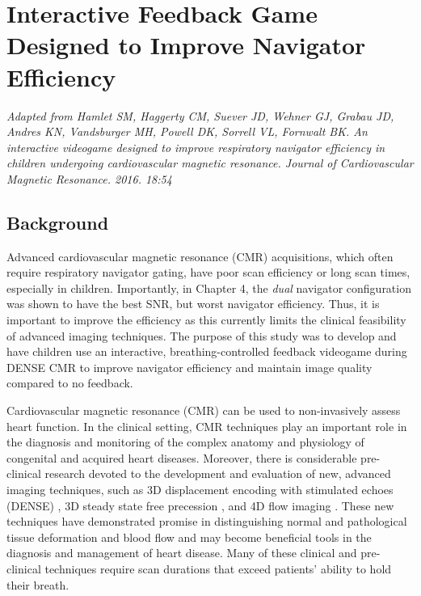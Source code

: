 \chapter{Interactive Feedback Game Designed to Improve Navigator Efficiency}

\begin{center}
	\textit{Adapted from Hamlet SM, Haggerty CM, Suever JD, Wehner GJ, Grabau JD, Andres KN, Vandsburger MH, Powell DK, Sorrell VL, Fornwalt BK. An interactive videogame designed to improve respiratory navigator efficiency in children undergoing cardiovascular magnetic resonance. Journal of Cardiovascular Magnetic Resonance. 2016. 18:54} \cite{Hamlet2016a}
\end{center}
	
\section{Background}
	Advanced cardiovascular magnetic resonance (CMR) acquisitions, which often require respiratory navigator gating, have poor scan efficiency or long scan times, especially in children. Importantly, in Chapter 4, the \textit{dual} navigator configuration was shown to have the best SNR, but worst navigator efficiency. Thus, it is important to improve the efficiency as this currently limits the clinical feasibility of advanced imaging techniques. The purpose of this study was to develop and have children use an interactive, breathing-controlled feedback videogame during DENSE CMR to improve navigator efficiency and maintain image quality compared to no feedback.

	Cardiovascular magnetic resonance (CMR) can be used to non-invasively assess heart function. In the clinical setting, CMR techniques play an important role in the diagnosis and monitoring of the complex anatomy and physiology of congenital and acquired heart diseases. Moreover, there is considerable pre-clinical research devoted to the development and evaluation of new, advanced imaging techniques, such as 3D displacement encoding with stimulated echoes (DENSE) \cite{Zhong2010a}, 3D steady state free precession \cite{Potthast2010}, and 4D flow imaging \cite{Markl2011}. These new techniques have demonstrated promise in distinguishing normal and pathological tissue deformation and blood flow and may become beneficial tools in the diagnosis and management of heart disease. Many of these clinical and pre-clinical techniques require scan durations that exceed patients' ability to hold their breath.
	
